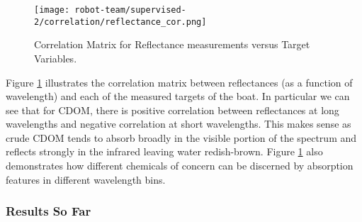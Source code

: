 \begin{figure}[h]
  \texttt{[image: robot-team/supervised-2/correlation/reflectance\_cor.png]}
  \caption{Correlation Matrix for Reflectance measurements versus Target Variables.\label{ref_cor}}
  \label{fig:correlation}
\end{figure}

Figure \ref{fig:correlation} illustrates the correlation matrix between reflectances (as a function of wavelength) and each of the measured targets of the boat. In particular we can see that for CDOM, there is positive correlation between reflectances at long wavelengths  and negative correlation at short wavelengths. This makes sense as crude CDOM tends to absorb broadly in the visible portion of the spectrum and reflects strongly in the infrared leaving water redish-brown. Figure \ref{fig:correlation} also demonstrates how different chemicals of concern can be discerned by absorption features in different wavelength bins.




\subsubsection{Results So Far}


